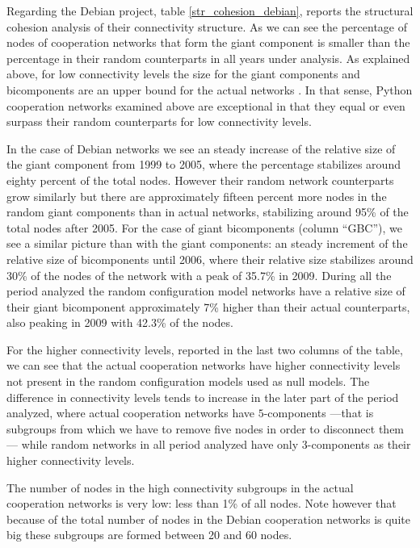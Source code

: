 

Regarding the Debian project, table \ref{str_cohesion_debian}, reports the structural cohesion analysis of their connectivity structure. As we can see the percentage of nodes of cooperation networks that form the giant component is smaller than the percentage in their random counterparts in all years under analysis. As explained above, for low connectivity levels the size for the giant components and bicomponents are an upper bound for the actual networks \citep{moody:2004}. In that sense, Python cooperation networks examined above are exceptional in that they equal or even surpass their random counterparts for low connectivity levels.

In the case of Debian networks we see an steady increase of the relative size of the giant component from 1999 to 2005, where the percentage stabilizes around eighty percent of the total nodes. However their random network counterparts grow similarly but there are approximately fifteen percent more nodes in the random giant components than in actual networks, stabilizing around 95\% of the total nodes after 2005. For the case of giant bicomponents (column ``GBC''), we see a similar picture than with the giant components: an steady increment of the relative size of bicomponents until 2006, where their relative size stabilizes around 30\% of the nodes of the network with a peak of 35.7\% in 2009. During all the period analyzed the random configuration model networks have a relative size of their giant bicomponent approximately 7\% higher than their actual counterparts, also peaking in 2009 with 42.3\% of the nodes.   

For the higher connectivity levels, reported in the last two columns of the table, we can see that the actual cooperation networks have higher connectivity levels not present in the random configuration models used as null models. The difference in connectivity levels tends to increase in the later part of the period analyzed, where actual cooperation networks have $5$-components ---that is subgroups from which we have to remove five nodes in order to disconnect them--- while random networks in all period analyzed have only $3$-components as their higher connectivity levels.

The number of nodes in the high connectivity subgroups in the actual cooperation networks is very low: less than 1\% of all nodes. Note however that because of the total number of nodes in the Debian cooperation networks is quite big these subgroups are formed between 20 and 60 nodes. 

